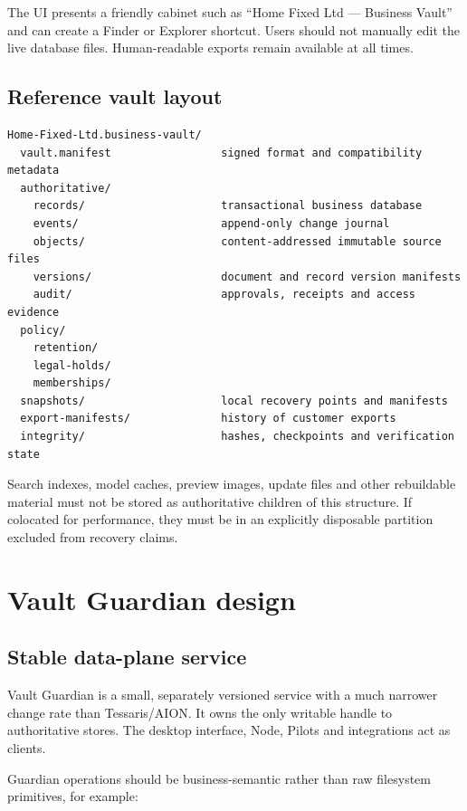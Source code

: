 \documentclass[11pt]{article}
\begin{document}
The UI presents a friendly cabinet such as ``Home Fixed Ltd --- Business Vault'' and can create a Finder or Explorer shortcut. Users should not manually edit the live database files. Human-readable exports remain available at all times.

\subsection{Reference vault layout}

\begin{verbatim}
Home-Fixed-Ltd.business-vault/
  vault.manifest                 signed format and compatibility metadata
  authoritative/
    records/                     transactional business database
    events/                      append-only change journal
    objects/                     content-addressed immutable source files
    versions/                    document and record version manifests
    audit/                       approvals, receipts and access evidence
  policy/
    retention/
    legal-holds/
    memberships/
  snapshots/                     local recovery points and manifests
  export-manifests/              history of customer exports
  integrity/                     hashes, checkpoints and verification state
\end{verbatim}

Search indexes, model caches, preview images, update files and other rebuildable material must not be stored as authoritative children of this structure. If colocated for performance, they must be in an explicitly disposable partition excluded from recovery claims.

\section{Vault Guardian design}

\subsection{Stable data-plane service}

Vault Guardian is a small, separately versioned service with a much narrower change rate than Tessaris/AION. It owns the only writable handle to authoritative stores. The desktop interface, Node, Pilots and integrations act as clients.

Guardian operations should be business-semantic rather than raw filesystem primitives, for example:
\end{document}
